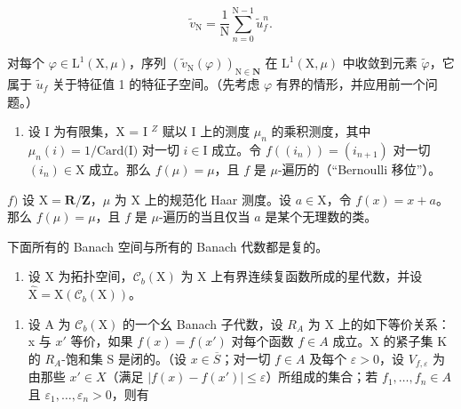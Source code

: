 \[
\widetilde {v} _ {\mathrm{N}} = \frac {1}{\mathrm{N}} \sum_ {n = 0} ^ {\mathrm{N-1}} \widetilde {u} _ {f} ^ {n}.
\]

对每个 \(\varphi\in\mathrm{L}^{1}(\mathrm{X},\mu)\)，序列 \((\widetilde{v}_{\mathrm{N}}(\varphi))_{\mathrm{N}\in\mathbf{N}}\) 在 \(\mathrm{L}^{1}(\mathrm{X},\mu)\) 中收敛到元素 \(\widetilde{\varphi}\)，它属于 \(\widetilde{u}_{f}\) 关于特征值 1 的特征子空间。（先考虑 \(\varphi\) 有界的情形，并应用前一个问题。）

\begin{enumerate}
\def\labelenumi{\alph{enumi})}
\setcounter{enumi}{4}
\tightlist
\item
  设 I 为有限集，X = I \(^{Z}\) 赋以 I 上的测度 \(\mu_n\) 的乘积测度，其中 \(\mu_n(i) = 1/\text{Card(I)}\) 对一切 \(i \in \text{I}\) 成立。令 \(f((i_n)) = (i_{n+1})\) 对一切 \((i_n) \in \text{X}\) 成立。那么 \(f(\mu) = \mu\)，且 \(f\) 是 \(\mu\)-遍历的（“Bernoulli 移位”）。
\end{enumerate}

\(f)\) 设 \(\mathrm{X} = \mathbf{R} / \mathbf{Z}\)，\(\mu\) 为 \(\mathrm{X}\) 上的规范化 Haar 测度。设 \(a \in \mathrm{X}\)，令 \(f(x) = x + a\)。那么 \(f(\mu) = \mu\)，且 \(f\) 是 \(\mu\)-遍历的当且仅当 \(a\) 是某个无理数的类。


下面所有的 Banach 空间与所有的 Banach 代数都是复的。

\begin{enumerate}
\def\labelenumi{\arabic{enumi})}
\tightlist
\item
  设 X 为拓扑空间，\(\mathcal{C}_{b}(\mathrm{X})\) 为 X 上有界连续复函数所成的星代数，并设 \(\widehat{\mathrm{X}} = \mathrm{X}(\mathcal{C}_{b}(\mathrm{X}))\)。
\end{enumerate}

\begin{enumerate}
\def\labelenumi{\alph{enumi})}
\tightlist
\item
  设 A 为 \(\mathcal{C}_{b}(\mathrm{X})\) 的一个幺 Banach 子代数，设 \(R_{A}\) 为 X 上的如下等价关系：x 与 \(x'\) 等价，如果 \(f(x) = f(x')\) 对每个函数 \(f \in A\) 成立。X 的紧子集 K 的 \(R_{A}\)-饱和集 S 是闭的。（设 \(x \in \overline{S}\)；对一切 \(f \in A\) 及每个 \(\varepsilon > 0\)，设 \(V_{f,\varepsilon}\) 为由那些 \(x' \in X\)（满足 \(|f(x) - f(x')| \leqslant \varepsilon\)）所组成的集合；若 \(f_{1}, \ldots, f_{n} \in A\) 且 \(\varepsilon_{1}, \ldots, \varepsilon_{n} > 0\)，则有
\end{enumerate}

